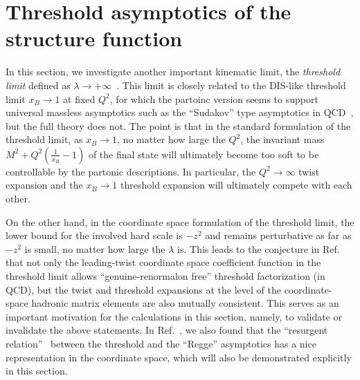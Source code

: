 \documentclass[a4paper,11pt]{article}
\begin{document}
\section{Threshold asymptotics of the structure function}\label{sec:threshold}
In this section, we investigate another important kinematic limit, the {\it threshold limit} defined as $\lambda \rightarrow +\infty$~\cite{Liu:2023onm}. This limit is closely related to the DIS-like threshold limit 
$x_B \rightarrow 1$ at fixed $Q^2$, for which the partoinc version seems to support universal massless asymptotics such as the ``Sudakov'' type asymptotics in QCD~\cite{Sen:1981sd, Mueller:1984vh,Korchemsky:1988pn,Korchemsky:1988hd}, but the full theory does not. The point is that in the standard formulation of the threshold limit, as $x_B \rightarrow 1$, no matter how large the $Q^2$, the invariant mass $M^2+Q^2(\frac{1}{x_B}-1)$ of the final state will ultimately become too soft to be controllable by the partonic descriptions. In particular, the $Q^2 \rightarrow \infty$ twist expansion and the $x_B \rightarrow 1$ threshold expansion will ultimately compete with each other. 

On the other hand, in the coordinate space formulation of the threshold limit, the lower bound for the involved hard scale is $-z^2$ and remains perturbative as far as $-z^2$ is small, no matter how large the $\lambda$ is. This leads to the conjecture in Ref.~\cite{Liu:2023onm} that not only the leading-twist coordinate space coefficient function in the threshold limit allows ``genuine-renormalon free'' threshold factorization (in QCD), but the twist and threshold expansions at the level of the coordinate-space hadronic matrix elements are also mutually consistent. This serves as an important motivation for the calculations in this section, namely, to validate or invalidate the above statements. In Ref.~\cite{Liu:2023onm}, we also found that the ``resurgent relation''~\cite{Basso:2006nk} between the threshold and the ``Regge'' asymptotics has a nice representation in the coordinate space, which will also be demonstrated explicitly in this section.   
\end{document}
